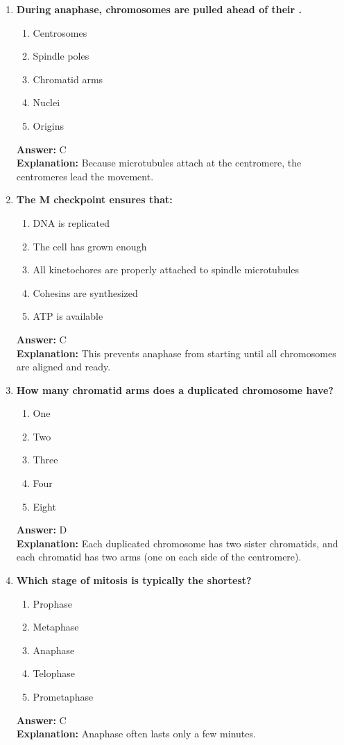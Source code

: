 \documentclass[11pt, a4paper]{article}
\begin{document}
\begin{enumerate}[leftmargin=*, label=\arabic*.]
\item \textbf{During anaphase, chromosomes are pulled ahead of their \underline{\hspace{1cm}}.}
\begin{enumerate}[label=\Alph*.]
\item Centrosomes
\item Spindle poles
\item Chromatid arms
\item Nuclei
\item Origins
\end{enumerate}
\textbf{Answer:} C \\
\textbf{Explanation:} Because microtubules attach at the centromere, the centromeres lead the movement.

\item \textbf{The M checkpoint ensures that:}
\begin{enumerate}[label=\Alph*.]
\item DNA is replicated
\item The cell has grown enough
\item All kinetochores are properly attached to spindle microtubules
\item Cohesins are synthesized
\item ATP is available
\end{enumerate}
\textbf{Answer:} C \\
\textbf{Explanation:} This prevents anaphase from starting until all chromosomes are aligned and ready.

\item \textbf{How many chromatid arms does a duplicated chromosome have?}
\begin{enumerate}[label=\Alph*.]
\item One
\item Two
\item Three
\item Four
\item Eight
\end{enumerate}
\textbf{Answer:} D \\
\textbf{Explanation:} Each duplicated chromosome has two sister chromatids, and each chromatid has two arms (one on each side of the centromere).

\item \textbf{Which stage of mitosis is typically the shortest?}
\begin{enumerate}[label=\Alph*.]
\item Prophase
\item Metaphase
\item Anaphase
\item Telophase
\item Prometaphase
\end{enumerate}
\textbf{Answer:} C \\
\textbf{Explanation:} Anaphase often lasts only a few minutes.


\end{enumerate}
\end{document}
